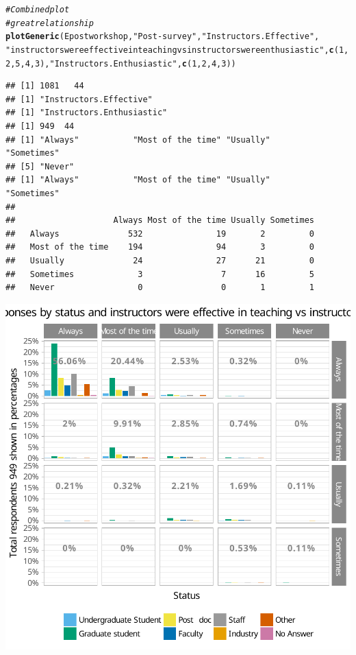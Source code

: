 \documentclass{article}\usepackage[]{graphicx}\usepackage[]{color}
\makeatletter
\newcommand{\hlnum}[1]{\textcolor[rgb]{0.686,0.059,0.569}{#1}}%
\newcommand{\hlstr}[1]{\textcolor[rgb]{0.192,0.494,0.8}{#1}}%
\newcommand{\hlcom}[1]{\textcolor[rgb]{0.678,0.584,0.686}{\textit{#1}}}%
\newcommand{\hlstd}[1]{\textcolor[rgb]{0.345,0.345,0.345}{#1}}%
\newcommand{\hlkwd}[1]{\textcolor[rgb]{0.737,0.353,0.396}{\textbf{#1}}}%
\newenvironment{kframe}{%
 \def\at@end@of@kframe{}%
 \ifinner\ifhmode%
  \def\at@end@of@kframe{\end{minipage}}%
  \begin{minipage}{\columnwidth}%
 \fi\fi%
 \def\FrameCommand##1{\hskip\@totalleftmargin \hskip-\fboxsep
 \colorbox{shadecolor}{##1}\hskip-\fboxsep
     \hskip-\linewidth \hskip-\@totalleftmargin \hskip\columnwidth}%
 \MakeFramed {\advance\hsize-\width
   \@totalleftmargin\z@ \linewidth\hsize
   \@setminipage}}%
 {\par\unskip\endMakeFramed%
 \at@end@of@kframe}
\newenvironment{knitrout}{}{} %
\makeatother
\begin{document}
\begin{knitrout}
\begin{kframe}\begin{alltt}
\hlcom{# Combined plot}
\hlcom{# great relationship}
\hlkwd{plotGeneric}\hlstd{(Epostworkshop,} \hlstr{"Post-survey"}\hlstd{,} \hlstr{"Instructors.Effective"} \hlstd{,}
            \hlstr{"instructors were effective in teaching vs instructors were enthusiastic"}\hlstd{,}  \hlkwd{c}\hlstd{(}\hlnum{1}\hlstd{,}\hlnum{2}\hlstd{,}\hlnum{5}\hlstd{,}\hlnum{4}\hlstd{,}\hlnum{3}\hlstd{),}\hlstr{"Instructors.Enthusiastic"}\hlstd{,} \hlkwd{c}\hlstd{(}\hlnum{1}\hlstd{,}\hlnum{2}\hlstd{,}\hlnum{4}\hlstd{,}\hlnum{3}\hlstd{))}
\end{alltt}
\begin{verbatim}
## [1] 1081   44
## [1] "Instructors.Effective"
## [1] "Instructors.Enthusiastic"
## [1] 949  44
## [1] "Always"           "Most of the time" "Usually"          "Sometimes"       
## [5] "Never"           
## [1] "Always"           "Most of the time" "Usually"          "Sometimes"       
##                   
##                    Always Most of the time Usually Sometimes
##   Always              532               19       2         0
##   Most of the time    194               94       3         0
##   Usually              24               27      21         0
##   Sometimes             3                7      16         5
##   Never                 0                0       1         1
\end{verbatim}
\end{kframe}

{\centering \includegraphics[width=.6\linewidth]{figure/calls-Rnwplotting-postsurvey-data-30} 

}



\end{knitrout}
\end{document}

